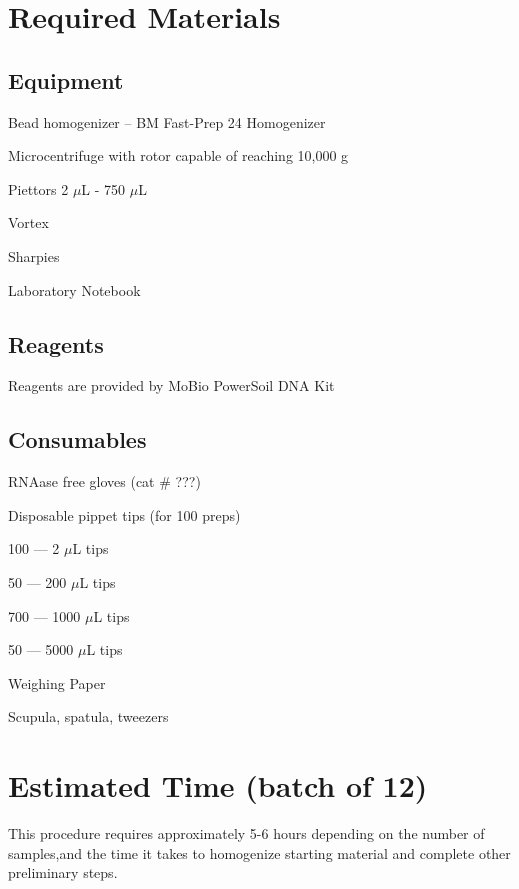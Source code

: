 \documentclass[12pt]{../SOP3_alpha}
\begin{document}
\section{Required Materials}

\subsection*{Equipment}

\NP Bead homogenizer -- BM Fast-Prep 24 Homogenizer

\NP Microcentrifuge with rotor capable of reaching 10,000 g

\NP Piettors 2 $\mu$L - 750 $\mu$L

\NP Vortex

\NP Sharpies

\NP Laboratory Notebook

\subsection*{Reagents}

\NP Reagents are provided by MoBio PowerSoil DNA Kit 

\subsection*{Consumables}

\NP RNAase free gloves (cat \# ???)

\NP Disposable pippet tips (for 100 preps) 

\begin{itemize*}
  \item 100 --- 2 $\mu$L tips
  \item 50 --- 200 $\mu$L tips
  \item 700 --- 1000 $\mu$L tips
  \item 50 --- 5000 $\mu$L tips
\end{itemize*}

\NP Weighing Paper

\NP Scupula, spatula, tweezers

\section{Estimated Time (batch of 12)}

\NP This procedure requires approximately 5-6 hours depending on the number of samples,and the time it takes to homogenize starting material and complete other preliminary steps.
\end{document}
